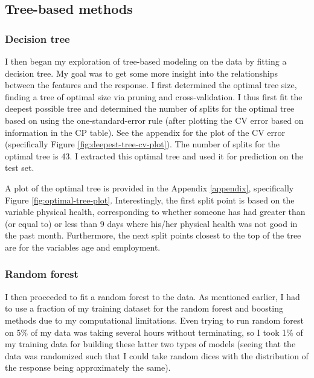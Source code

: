 \documentclass[
]{article}
\begin{document}
\hypertarget{tree-based-methods}{%
\subsection{Tree-based methods}\label{tree-based-methods}}

\hypertarget{decision-tree}{%
\subsubsection{Decision tree}\label{decision-tree}}

I then began my exploration of tree-based modeling on the data by fitting a decision tree. My goal was to get some more insight into the relationships between the features and the response. I first determined the optimal tree size, finding a tree of optimal size via pruning and cross-validation. I thus first fit the deepest possible tree and determined the number of splits for the optimal tree based on using the one-standard-error rule (after plotting the CV error based on information in the CP table). See the appendix for the plot of the CV error (specifically Figure \ref{fig:deepest-tree-cv-plot}). The number of splits for the optimal tree is 43. I extracted this optimal tree and used it for prediction on the test set.

A plot of the optimal tree is provided in the Appendix \ref{appendix}, specifically Figure \ref{fig:optimal-tree-plot}. Interestingly, the first split point is based on the variable physical health, corresponding to whether someone has had greater than (or equal to) or less than 9 days where his/her physical health was not good in the past month. Furthermore, the next split points closest to the top of the tree are for the variables age and employment.

\hypertarget{random-forest}{%
\subsubsection{Random forest}\label{random-forest}}

I then proceeded to fit a random forest to the data. As mentioned earlier, I had to use a fraction of my training dataset for the random forest and boosting methods due to my computational limitations. Even trying to run random forest on 5\% of my data was taking several hours without terminating, so I took 1\% of my training data for building these latter two types of models (seeing that the data was randomized such that I could take random dices with the distribution of the response being approximately the same).
\end{document}
